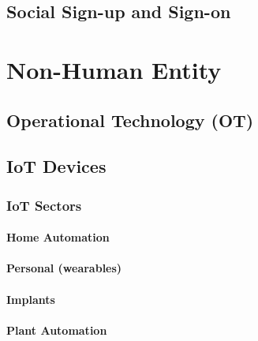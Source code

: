 \hypertarget{social-sign-up-and-sign-on}{%
\section{Social Sign-up and
Sign-on}\label{social-sign-up-and-sign-on}}

\hypertarget{non-human-entity}{%
\chapter{Non-Human Entity}\label{non-human-entity}}

\hypertarget{operational-technology-ot}{%
\section{Operational Technology
(OT)}\label{operational-technology-ot}}

\hypertarget{iot-devices}{%
\section{IoT Devices}\label{iot-devices}}

\hypertarget{iot-sectors}{%
\subsection{IoT Sectors}\label{iot-sectors}}

\hypertarget{home-automation}{%
\subsubsection{Home Automation}\label{home-automation}}

\hypertarget{personal-wearables}{%
\subsubsection{Personal (wearables)}\label{personal-wearables}}

\hypertarget{implants}{%
\subsubsection{Implants}\label{implants}}

\hypertarget{plant-automation}{%
\subsubsection{Plant Automation}\label{plant-automation}}

